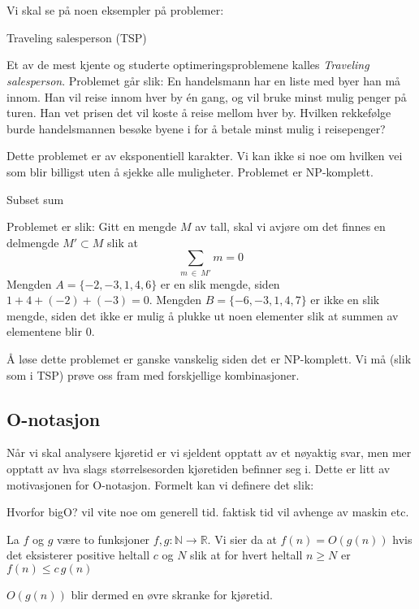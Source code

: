 ~\\~\\
\noindent Vi skal se på noen eksempler på problemer:

\begin{eks}
Traveling salesperson (TSP)

Et av de mest kjente og studerte optimeringsproblemene kalles \emph{Traveling salesperson}. Problemet går slik: En handelsmann har en liste med byer han må innom. Han vil reise innom hver by én gang, og vil bruke minst mulig penger på turen. Han vet prisen det vil koste å reise mellom hver by. Hvilken rekkefølge burde handelsmannen besøke byene i for å betale minst mulig i reisepenger?

Dette problemet er av eksponentiell karakter. Vi kan ikke si noe om hvilken vei som blir billigst uten å sjekke alle muligheter. Problemet er NP-komplett.
\end{eks}


\begin{eks}
Subset sum

Problemet er slik: Gitt en mengde $ M $ av tall, skal vi avjøre om det finnes en delmengde $ M' \subset M $ slik at  \[ \sum_{m~\in~M'} m = 0  \] Mengden $ A =  \{-2, -3, 1, 4, 6\} $ er en slik mengde, siden $ 1 + 4 + (-2) + (-3) = 0 $. Mengden $ B = \{-6, -3, 1, 4, 7\} $ er ikke en slik mengde, siden det ikke er mulig å plukke ut noen elementer slik at summen av elementene blir 0.

Å løse dette problemet er ganske vanskelig siden det er NP-komplett. Vi må (slik som i TSP) prøve oss fram med forskjellige kombinasjoner. 
\end{eks}



\subsection{O-notasjon}
Når vi skal analysere kjøretid er vi sjeldent opptatt av et nøyaktig svar, men mer opptatt av hva slags størrelsesorden kjøretiden befinner seg i. Dette er litt av motivasjonen for O-notasjon. Formelt kan vi definere det slik:

Hvorfor bigO? vil vite noe om generell tid. faktisk tid vil avhenge av maskin etc. 

\begin{definisjon}
\label{def:O}
La $ f $ og $ g $ være to funksjoner $ f, g:\mathbb{N} \rightarrow \mathbb{R} $. Vi sier da at $ f(n) = O(g(n))$ hvis det eksisterer positive heltall $ c $ og $ N $ slik at for hvert heltall $ n\geq N $ er $ f(n) \leq c\,g(n) $
\end{definisjon}
$ O(g(n)) $ blir dermed en øvre skranke for kjøretid.

